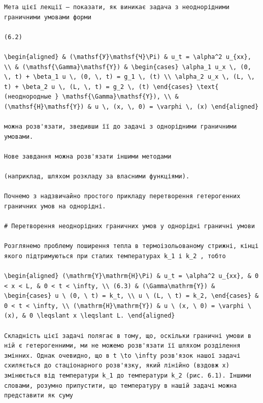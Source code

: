\documentclass[
  ukrainian,
]{article}
\begin{document}
\begin{verbatim}
Мета цієї лекції — показати, як виникає задача з неоднорідними граничними умовами форми

(6.2)

\begin{aligned} & (\mathsf{У}\mathsf{Ч}\Pi) & u_t = \alpha^2 u_{xx}, \\ & (\mathsf{\Gamma}\mathsf{Y}) & \begin{cases} \alpha_1 u_x \, (0, \, t) + \beta_1 u \, (0, \, t) = g_1 \, (t) \\ \alpha_2 u_x \, (L, \, t) + \beta_2 u \, (L, \, t) = g_2 \, (t) \end{cases} \text{ (неоднородные } \mathsf{\Gamma}\mathsf{Y}), \\ & (\mathsf{H}\mathsf{Y}) & u \, (x, \, 0) = \varphi \, (x) \end{aligned}

можна розв'язати, зведивши її до задачі з однорідними граничними умовами.

Нове завдання можна розв'язати іншими методами

(наприклад, шляхом розкладу за власними функціями).

Почнемо з надзвичайно простого прикладу перетворення гетерогенних граничних умов на однорідні.

# Перетворення неоднорідних граничних умов у однорідні граничні умови

Розглянемо проблему поширення тепла в термоізольованому стрижні, кінці якого підтримуються при сталих температурах k_1 і k_2 , тобто

\begin{aligned} (\mathrm{Y}\mathrm{H}\Pi) & u_t = \alpha^2 u_{xx}, & 0 < x < L, & 0 < t < \infty, \\ (6.3) & (\Gamma\mathrm{Y}) & \begin{cases} u \ (0, \ t) = k_t, \\ u \ (L, \ t) = k_2, \end{cases} & 0 < t < \infty, \\ (\mathrm{H}\mathrm{Y}) & u \ (x, \ 0) = \varphi \ (x), & 0 \leqslant x \leqslant L. \end{aligned}

Складність цієї задачі полягає в тому, що, оскільки граничні умови в ній є гетерогенними, ми не можемо розв'язати її шляхом розділення змінних. Однак очевидно, що в t \to \infty розв'язок нашої задачі схиляється до стаціонарного розв'язку, який лінійно (вздовж x) змінюється від температури k_1 до температури k_2 (рис. 6.1). Іншими словами, розумно припустити, що температуру в нашій задачі можна представити як суму


\end{verbatim}
\end{document}
